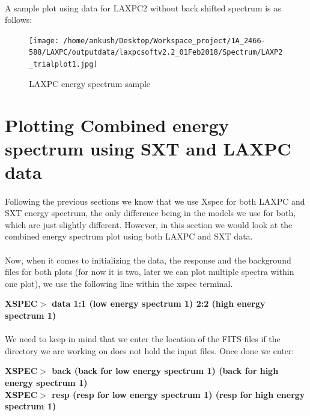\documentclass[a4paper,twoside]{report}
\numberwithin{equation}{section}
\begin{document}
\paragraph{}
A sample plot using data for LAXPC2 without back shifted spectrum is as follows:
\begin{figure}[h]
\begin{center}
\texttt{[image: /home/ankush/Desktop/Workspace\_project/1A\_2466-588/LAXPC/outputdata/laxpcsoftv2.2\_01Feb2018/Spectrum/LAXP2\_trialplot1.jpg]}
\caption{LAXPC energy spectrum sample}
\label{LAXPC_plot_sample}
\end{center}
\end{figure}
\section{Plotting Combined energy spectrum using SXT and LAXPC data}
\paragraph{}
Following the previous sections we know that we use Xspec for both LAXPC and SXT energy spectrum, the only difference being in the models we use for both, which are just slightly different. However, in this section we would look at the combined energy spectrum plot using both LAXPC and SXT data. 
\paragraph{}
Now, when it comes to initializing the data, the response and the background files for both plots (for now it is two, later we can plot multiple spectra within one plot), we use the following line within the xspec terminal.
\begin{center}
\textbf{XSPEC$>$ data 1:1 (low energy spectrum 1) 2:2 (high energy spectrum 1)}
\end{center}
\paragraph{}
We need to keep in mind that we enter the location of the FITS files if the directory we are working on does not hold the input files. Once done we enter:
\begin{center}
\textbf{XSPEC$>$ back (back for low energy spectrum 1) (back for high energy spectrum 1)} \\
\textbf{XSPEC$>$ resp (resp for low energy spectrum 1) (resp for high energy spectrum 1)} \\ 
\end{center}
\end{document}

